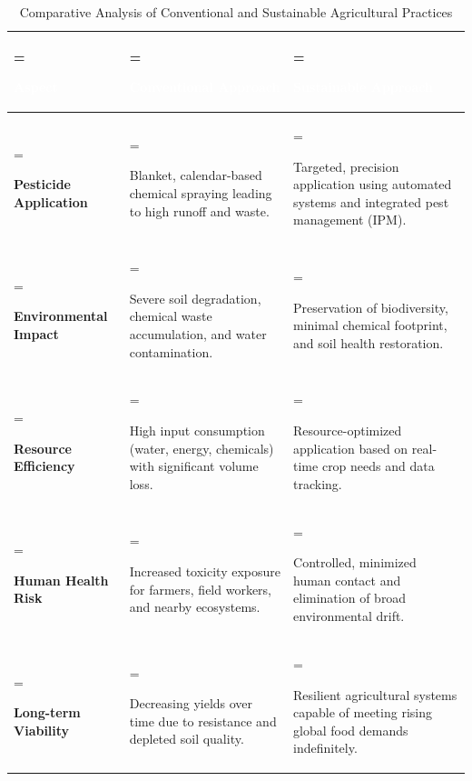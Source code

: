 \begin{table}[H]
    \centering
    \caption{Comparative Analysis of Conventional and Sustainable Agricultural Practices}
    \label{tab:conventional_vs_sustainable}
    \small 
    \setlength{\extrarowheight}{5pt} %
    
    \begin{tabularx}{\textwidth}{
        >{\hsize=0.4\hsize\linewidth=\hsize\raggedright\arraybackslash}X 
        >{\hsize=0.8\hsize\linewidth=\hsize\raggedright\arraybackslash}X 
        >{\hsize=0.8\hsize\linewidth=\hsize\raggedright\arraybackslash}X}
        \toprule
        
        \rowcolor[HTML]{2C3E50} %
        \textcolor{white}{\textbf{Aspect}} & 
        \textcolor{white}{\textbf{Conventional Approach}} & 
        \textcolor{white}{\textbf{Sustainable Approach}} \\
        \midrule
        
        \textbf{Pesticide Application} & 
        Blanket, calendar-based chemical spraying leading to high runoff and waste. & 
        Targeted, precision application using automated systems and integrated pest management (IPM). \\
        
        \rowcolor[HTML]{F2F4F4} %
        \textbf{Environmental Impact} & 
        Severe soil degradation, chemical waste accumulation, and water contamination. & 
        Preservation of biodiversity, minimal chemical footprint, and soil health restoration. \\
        
        \textbf{Resource Efficiency} & 
        High input consumption (water, energy, chemicals) with significant volume loss. & 
        Resource-optimized application based on real-time crop needs and data tracking. \\
        
        \rowcolor[HTML]{F2F4F4} %
        \textbf{Human Health Risk} & 
        Increased toxicity exposure for farmers, field workers, and nearby ecosystems. & 
        Controlled, minimized human contact and elimination of broad environmental drift. \\
        
        \textbf{Long-term Viability} & 
        Decreasing yields over time due to resistance and depleted soil quality. & 
        Resilient agricultural systems capable of meeting rising global food demands indefinitely. \\
        \bottomrule
    \end{tabularx}
\end{table}

